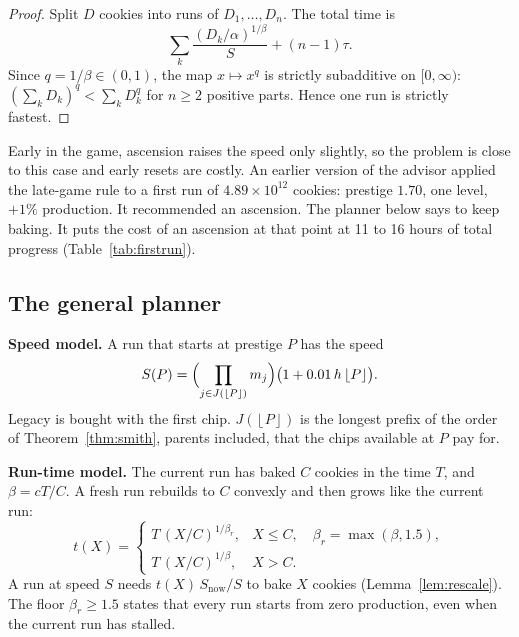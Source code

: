\documentclass[11pt,a4paper]{article}
\numberwithin{equation}{section}
\theoremstyle{definition}
\theoremstyle{remark}
\newcommand{\floor}[1]{\left\lfloor#1\right\rfloor}
\newcommand{\proofstep}[1]{\par\addvspace{\medskipamount}\noindent\textbf{#1}\enspace\ignorespaces}
\begin{document}
\begin{proof}
Split $D$ cookies into runs of $D_1,\ldots,D_n$. The total time is
\[
 \sum_k\frac{(D_k/\alpha)^{1/\beta}}S+(n-1)\tau.
\]
Since $q=1/\beta\in(0,1)$, the map $x\mapsto x^q$ is strictly subadditive on $[0,\infty)$: $(\sum_kD_k)^q<\sum_kD_k^q$ for $n\ge2$ positive parts. Hence one run is strictly fastest.
\end{proof}

Early in the game, ascension raises the speed only slightly, so the problem is close to this case and early resets are costly. An earlier version of the advisor applied the late-game rule to a first run of $4.89\times10^{12}$ cookies: prestige $1.70$, one level, $+1\%$ production. It recommended an ascension. The planner below says to keep baking. It puts the cost of an ascension at that point at 11 to 16 hours of total progress (Table~\ref{tab:firstrun}).

\subsection{The general planner}\label{sec:dp}
\proofstep{Speed model.} A run that starts at prestige $P$ has the speed
\begin{equation}\label{eq:speed}
 S(P)=\Bigl(\prod_{j\in J(\floor P)}m_j\Bigr)\bigl(1+0.01\,h\floor P\bigr).
\end{equation}
Legacy is bought with the first chip. $J(\floor P)$ is the longest prefix of the order of Theorem~\ref{thm:smith}, parents included, that the chips available at $P$ pay for.

\proofstep{Run-time model.} The current run has baked $C$ cookies in the time $T$, and $\beta=cT/C$. A fresh run rebuilds to $C$ convexly and then grows like the current run:
\begin{equation}\label{eq:run-model}
 t(X)=\begin{cases}T\,(X/C)^{1/\beta_r},&X\le C,\quad\beta_r=\max(\beta,1.5),\\[2pt] T\,(X/C)^{1/\beta},&X>C.\end{cases}
\end{equation}
A run at speed $S$ needs $t(X)\,S_{\mathrm{now}}/S$ to bake $X$ cookies (Lemma~\ref{lem:rescale}). The floor $\beta_r\ge1.5$ states that every run starts from zero production, even when the current run has stalled.
\end{document}

